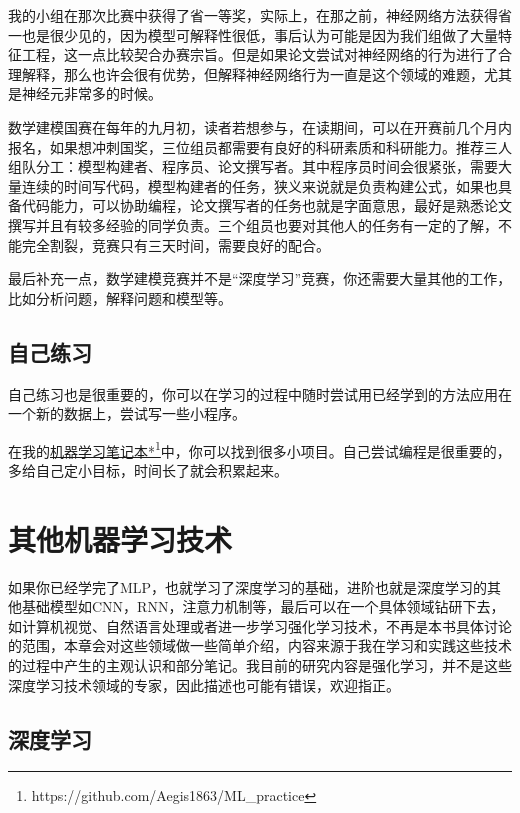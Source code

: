 \documentclass[a5paper, 11pt]{ctexbook}
\begin{document}
我的小组在那次比赛中获得了省一等奖，实际上，在那之前，神经网络方法获得省一也是很少见的，因为模型可解释性很低，事后认为可能是因为我们组做了大量特征工程，这一点比较契合办赛宗旨。但是如果论文尝试对神经网络的行为进行了合理解释，那么也许会很有优势，但解释神经网络行为一直是这个领域的难题，尤其是神经元非常多的时候。

数学建模国赛在每年的九月初，读者若想参与，在读期间，可以在开赛前几个月内报名，如果想冲刺国奖，三位组员都需要有良好的科研素质和科研能力。推荐三人组队分工：模型构建者、程序员、论文撰写者。其中程序员时间会很紧张，需要大量连续的时间写代码，模型构建者的任务，狭义来说就是负责构建公式，如果也具备代码能力，可以协助编程，论文撰写者的任务也就是字面意思，最好是熟悉论文撰写并且有较多经验的同学负责。三个组员也要对其他人的任务有一定的了解，不能完全割裂，竞赛只有三天时间，需要良好的配合。

最后补充一点，数学建模竞赛并不是“深度学习”竞赛，你还需要大量其他的工作，比如分析问题，解释问题和模型等。

\section{自己练习}

自己练习也是很重要的，你可以在学习的过程中随时尝试用已经学到的方法应用在一个新的数据上，尝试写一些小程序。

在我的\href{https://github.com/Aegis1863/ML\_practice}{机器学习笔记本*}\footnote{https://github.com/Aegis1863/ML\_practice}中，你可以找到很多小项目。自己尝试编程是很重要的，多给自己定小目标，时间长了就会积累起来。


\chapter{其他机器学习技术}

如果你已经学完了MLP，也就学习了深度学习的基础，进阶也就是深度学习的其他基础模型如CNN，RNN，注意力机制等，最后可以在一个具体领域钻研下去，如计算机视觉、自然语言处理或者进一步学习强化学习技术，不再是本书具体讨论的范围，本章会对这些领域做一些简单介绍，内容来源于我在学习和实践这些技术的过程中产生的主观认识和部分笔记。我目前的研究内容是强化学习，并不是这些深度学习技术领域的专家，因此描述也可能有错误，欢迎指正。

\section{深度学习}
\end{document}
